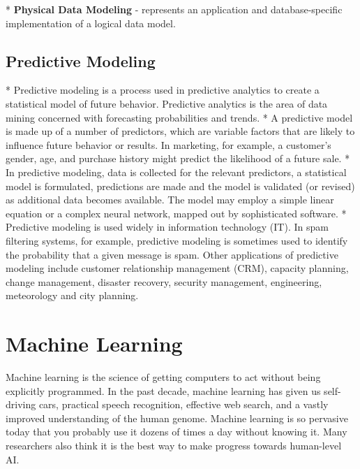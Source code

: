 \begin{description}
*   \textbf{Physical Data Modeling} - represents an application and database-specific implementation of a logical data model.
    

    \subsection*{ Predictive Modeling }

*  Predictive modeling is a process used in predictive analytics to create a statistical model of future behavior. Predictive analytics is the area of data mining concerned with forecasting probabilities and trends.
*  
A predictive model is made up of a number of predictors, which are variable factors that are likely to influence future behavior or results. In marketing, for example, a customer's gender, age, and purchase history might predict the likelihood of a future sale.
*  
In predictive modeling, data is collected for the relevant predictors, a statistical model is formulated, predictions are made and the model is validated (or revised) as additional data becomes available. The model may employ a simple linear equation or a complex neural network, mapped out by sophisticated software.
*  
Predictive modeling is used widely in information technology (IT). In spam filtering systems, for example, predictive modeling is sometimes used to identify the probability that a given message is spam. Other applications of predictive modeling include customer relationship management (CRM), capacity planning, change management, disaster recovery, security management, engineering, meteorology and city planning.


\section{Machine Learning}





Machine learning is the science of getting computers to act without being explicitly programmed. In the past decade, machine learning has given us self-driving cars, practical speech recognition, effective web search, and a vastly improved understanding of the human genome. Machine learning is so pervasive today that you probably use it dozens of times a day without knowing it. Many researchers also think it is the best way to make progress towards human-level AI.



\end{description}
